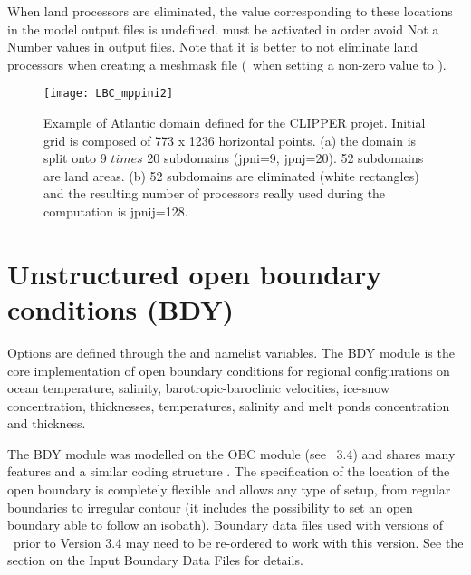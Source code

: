 \documentclass[../main/NEMO_manual]{subfiles}
\begin{document}
When land processors are eliminated, the value corresponding to these locations in the model output files is undefined.  must be activated in order avoid Not a Number values in output files. Note that it is better to not eliminate land processors when creating a meshmask file (\ie\ when setting a non-zero value to ).

\begin{figure}[!ht]
  \centering
  \texttt{[image: LBC\_mppini2]}
  \caption[Atlantic domain defined for the CLIPPER projet]{
    Example of Atlantic domain defined for the CLIPPER projet.
    Initial grid is composed of 773 x 1236 horizontal points.
    (a) the domain is split onto 9 $times$ 20 subdomains (jpni=9, jpnj=20).
    52 subdomains are land areas.
    (b) 52 subdomains are eliminated (white rectangles) and
    the resulting number of processors really used during the computation is jpnij=128.}
  \label{fig:LBC_mppini2}
\end{figure}

\section{Unstructured open boundary conditions (BDY)}
\label{sec:LBC_bdy}

\begin{listing}
  \caption{}
  \label{lst:nambdy}
\end{listing}

\begin{listing}
  \caption{}
  \label{lst:nambdy_dta}
\end{listing}

Options are defined through the  and  namelist variables.
The BDY module is the core implementation of open boundary conditions for regional configurations on
ocean temperature, salinity, barotropic-baroclinic velocities, ice-snow concentration, thicknesses, temperatures, salinity and melt ponds concentration and thickness.

The BDY module was modelled on the OBC module (see \NEMO\ 3.4) and shares many features and
a similar coding structure \citep{chanut_trpt05}.
The specification of the location of the open boundary is completely flexible and
allows any type of setup, from regular boundaries to irregular contour (it includes the possibility to set an open boundary able to follow an isobath).
Boundary data files used with versions of \NEMO\ prior to Version 3.4 may need to be re-ordered to work with this version.
See the section on the Input Boundary Data Files for details.
\end{document}
